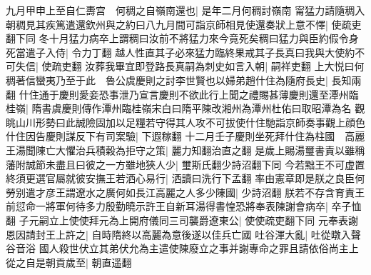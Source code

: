 九月甲申上至自仁夀宫　何稠之自嶺南還也|{
	是年二月何稠討嶺南}
甯猛力請隨稠入朝稠見其疾篤遣還欽州與之約曰八九月間可詣京師相見使還奏狀上意不懌|{
	使疏吏翻下同}
冬十月猛力病卒上謂稠曰汝前不將猛力來今竟死矣稠曰猛力與臣約假令身死當遣子入侍|{
	令力丁翻}
越人性直其子必來猛力臨終果戒其子長真曰我與大使約不可失信|{
	使疏吏翻}
汝葬我畢宜即登路長真嗣為刺史如言入朝|{
	嗣祥吏翻}
上大悦曰何稠著信蠻夷乃至于此　魯公虞慶則之討李世賢也以婦弟趙什住為隨府長史|{
	長知兩翻}
什住通于慶則愛妾恐事泄乃宣言慶則不欲此行上聞之禮賜甚薄慶則還至潭州臨桂嶺|{
	隋書虞慶則傳作潭州臨桂嶺宋白曰隋平陳改湘州為潭州杜佑曰取昭潭為名}
觀眺山川形勢曰此誠險固加以足糧若守得其人攻不可拔使什住馳詣京師奏事觀上顔色什住因告慶則謀反下有司案驗|{
	下遐稼翻}
十二月壬子慶則坐死拜什住為柱國　高麗王湯聞陳亡大懼治兵積穀為拒守之策|{
	麗力知翻治直之翻}
是歲上賜湯璽書責以雖稱藩附誠節未盡且曰彼之一方雖地狹人少|{
	璽斯氏翻少詩沼翻下同}
今若黜王不可虚置終須更選官屬就彼安撫王若洒心易行|{
	洒讀曰洗行下孟翻}
率由憲章即是朕之良臣何勞别遣才彦王謂遼水之廣何如長江高麗之人多少陳國|{
	少詩沼翻}
朕若不存含育責王前愆命一將軍何待多力殷勤曉示許王自新耳湯得書惶恐將奉表陳謝會病卒|{
	卒子恤翻}
子元嗣立上使使拜元為上開府儀同三司襲爵遼東公|{
	使使疏吏翻下同}
元奉表謝恩因請封王上許之|{
	自時隋終以高麗為意後遂以佳兵亡國}
吐谷渾大亂|{
	吐從暾入聲谷音浴}
國人殺世伏立其弟伏允為主遣使陳廢立之事并謝專命之罪且請依俗尚主上從之自是朝貢歲至|{
	朝直遥翻}



